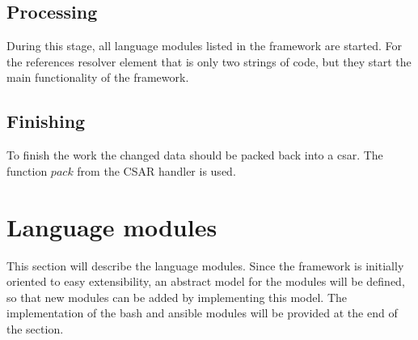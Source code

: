 \subsection*{Processing}
During this stage, all language modules listed in the framework are started.
For the references resolver element that is only two strings of code, but they start the main functionality of the framework.


\subsection*{Finishing}
To finish the work the changed data should be packed back into a \gls{csar}.
The function $pack$ from the CSAR handler is used. 

\section{Language modules} 
This section will describe the language modules. %
Since the framework is initially oriented to easy extensibility, an abstract model for the modules will be defined, so that new modules can be added by implementing this model.
The implementation of the bash and ansible modules will be provided at the end of the section.

